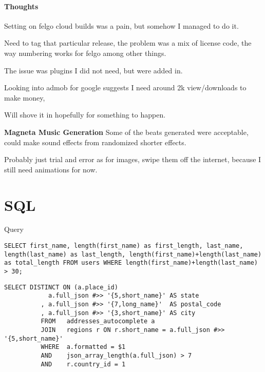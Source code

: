 

\paragraph{Thoughts}

Setting on felgo cloud builds was a pain, but somehow I managed to do it.

Need to tag that particular release, the problem was a mix of license code, the way numbering works for felgo among other things.

The issue was plugins I did not need, but were added in.

Looking into admob for google suggests I need around 2k view/downloads to make money,

Will shove it in hopefully for something to happen.

\textbf{Magneta Music Generation} Some of the beats generated were acceptable, could make sound effects from randomized shorter effects.

Probably just trial and error as for images, swipe them off the internet, because I still need animations for now.


\section{SQL}

Query
\begin{lstlisting}[caption={SQL Query for length}]
SELECT first_name, length(first_name) as first_length, last_name, length(last_name) as last_length, length(first_name)+length(last_name) as total_length FROM users WHERE length(first_name)+length(last_name) > 30;
\end{lstlisting}

\begin{lstlisting}[caption={SQL Query for addresses}]
SELECT DISTINCT ON (a.place_id)
            a.full_json #>> '{5,short_name}' AS state
          , a.full_json #>> '{7,long_name}'  AS postal_code
          , a.full_json #>> '{3,short_name}' AS city
          FROM   addresses_autocomplete a
          JOIN   regions r ON r.short_name = a.full_json #>> '{5,short_name}'
          WHERE  a.formatted = $1
          AND    json_array_length(a.full_json) > 7
          AND    r.country_id = 1
\end{lstlisting}